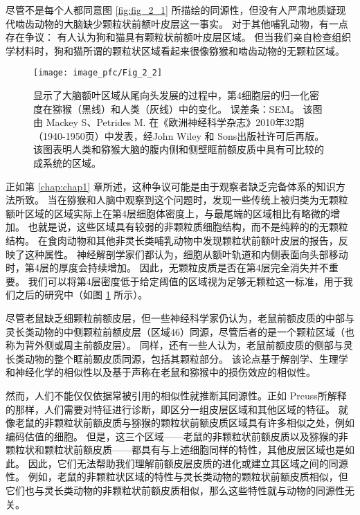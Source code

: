 尽管不是每个人都同意图 \ref{fig:fig_2_1} 所描绘的同源性，但没有人严肃地质疑现代啮齿动物的大脑缺少颗粒状前额叶皮层这一事实。
对于其他哺乳动物，有一点存在争议：
有人认为狗\cite{rajkowska1988intrinsic}和猫\cite{je1948orbitofrontal}具有颗粒状前额叶皮层区域。
但当我们亲自检查组织学材料时，狗和猫所谓的颗粒状区域看起来很像猕猴和啮齿动物的无颗粒区域。


\begin{figure}[!htb]
	\centering
	\texttt{[image: image\_pfc/Fig\_2\_2]}
	\caption{显示了大脑额叶区域从尾向头发展的过程中，第4细胞层的归一化密度在猕猴（黑线）和人类（灰线）中的变化。
		误差条：SEM。
		该图由 Mackey S、Petrides M. 在《欧洲神经科学杂志》2010年32期（1940-1950页）中发表，经John Wiley 和 Sons出版社许可后再版。
		该图表明人类和猕猴大脑的腹内侧和侧壁眶前额皮质中具有可比较的成系统的区域。\label{fig:fig_2_2}}
\end{figure}


正如第 \ref{chap:chap1} 章所述，这种争议可能是由于观察者缺乏完备体系的知识方法所致。
当在猕猴和人脑中观察到这个问题时\cite{mackey2010quantitative}，发现一些传统上被归类为无颗粒额叶区域的区域实际上在第4层细胞体密度上，与最尾端的区域相比有略微的增加。
也就是说，这些区域具有较弱的非颗粒质细胞结构，而不是纯粹的的无颗粒结构。
在食肉动物和其他非灵长类哺乳动物中发现颗粒状前额叶皮层的报告，反映了这种属性。
神经解剖学家们都认为，细胞从额叶轨道和内侧表面向头部移动时，第4层的厚度会持续增加。
因此，无颗粒皮质是否在第4层完全消失并不重要。
我们可以将第4层密度低于给定阈值的区域视为足够无颗粒这一标准，用于我们之后的研究中（如图 \ref{fig:fig_2_2} 所示）。


尽管老鼠缺乏细颗粒前额皮层，但一些神经科学家仍认为，老鼠前额皮质的中部与灵长类动物的中侧颗粒前额皮层（区域46）同源\cite{kolb2007all}，尽管后者的是一个颗粒区域（也称为背外侧或周主前额皮层）。
同样，还有一些人认为，老鼠前额皮质的侧部与灵长类动物的整个眶前颞皮质同源，包括其颗粒部分\cite{kolb2007all,schoenbaum2009new}。
该论点基于解剖学、生理学和神经化学的相似性以及基于声称在老鼠和猕猴中的损伤效应的相似性。


然而，人们不能仅仅依据常被引用的相似性就推断其同源性。正如 Preuss\cite{preuss1995rats}所解释的那样，人们需要对特征进行诊断，即区分一组皮层区域和其他区域的特征。
就像老鼠的非颗粒状前额皮质与猕猴的颗粒状前额皮质区域具有许多相似之处，例如编码估值的细胞。
但是，这三个区域——老鼠的非颗粒状前额皮质以及猕猴的非颗粒状和颗粒状前额皮质——都具有与上述细胞同样的特性，其他皮层区域也是如此。
因此，它们无法帮助我们理解前额皮层皮质的进化或建立其区域之间的同源性。
例如，老鼠的非颗粒状区域的特性与灵长类动物的颗粒状前额皮质相似，但它们也与灵长类动物的非颗粒状前额皮质相似，那么这些特性就与动物的同源性无关。


